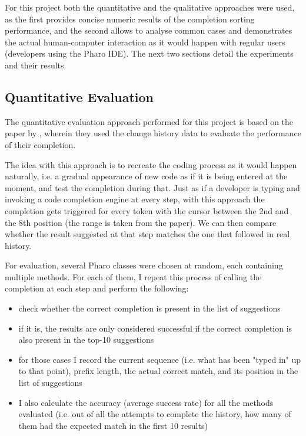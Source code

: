 \documentclass[sigplan,screen]{acmart}
\begin{document}
For this project both the quantitative and the qualitative approaches were used, as the first provides concise numeric results of the completion sorting performance, and the second allows to analyse common cases and demonstrates the actual human-computer interaction as it would happen with regular users (developers using the Pharo IDE). The next two sections detail the experiments and their results.

\subsection{Quantitative Evaluation}
The quantitative evaluation approach performed for this project is based on the paper by \cite{Robb08a}, wherein they used the change history data to evaluate the performance of their completion.

The idea with this approach is to recreate the coding process as it would happen naturally, i.e. a gradual appearance of new code as if it is being entered at the moment, and test the completion during that. Just as if a developer is typing and invoking a code completion engine at every step, with this approach the completion gets triggered for every token with the cursor between the 2nd and the 8th position (the range is taken from the \cite{Robb08a} paper). We can then compare whether the result suggested at that step matches the one that followed in real history.

For evaluation, several Pharo classes were chosen at random, each containing multiple methods. For each of them, I repeat this process of calling the completion at each step and perform the following:
\begin{itemize}
    \item check whether the correct completion is present in the list of suggestions
    \item if it is, the results are only considered successful if the correct completion is also present in the top-10 suggestions
    \item for those cases I record the current sequence (i.e. what has been "typed in" up to that point), prefix length, the actual correct match, and its position in the list of suggestions
    \item I also calculate the accuracy (average success rate) for all the methods evaluated (i.e. out of all the attempts to complete the history, how many of them had the expected match in the first 10 results)
\end{itemize}
\end{document}
